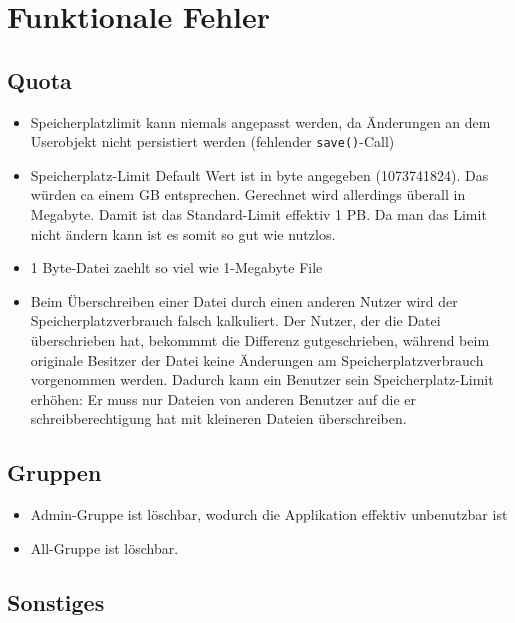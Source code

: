 \documentclass[12pt,DIV14,BCOR10mm,a4paper,parskip=half-,headsepline,headinclude,english,ngerman,bibliography=totocnumbered]{scrreprt}
\begin{document}
\vspace*{-3cm}

\tableofcontents  %

\chapter{Funktionale Fehler}


\section{Quota}

\begin{itemize}
 \item Speicherplatzlimit kann niemals angepasst werden, da Änderungen an dem Userobjekt nicht persistiert werden (fehlender \texttt{save()}-Call)
  \item Speicherplatz-Limit Default Wert ist in byte angegeben (1073741824). Das würden ca einem GB entsprechen. Gerechnet wird allerdings überall in Megabyte. Damit ist das Standard-Limit effektiv 1 PB. Da man das Limit nicht ändern kann ist es somit so gut wie nutzlos.
  \item 1 Byte-Datei zaehlt so viel wie 1-Megabyte File
  \item Beim Überschreiben einer Datei durch einen anderen Nutzer wird der Speicherplatzverbrauch falsch kalkuliert. Der Nutzer, der die Datei überschrieben hat, bekommmt die Differenz gutgeschrieben, während beim originale Besitzer der Datei keine Änderungen am Speicherplatzverbrauch vorgenommen werden. Dadurch kann ein Benutzer sein Speicherplatz-Limit erhöhen: Er muss nur Dateien von anderen Benutzer auf die er schreibberechtigung hat mit kleineren Dateien überschreiben.
  \end{itemize}



\section{Gruppen}
\begin{itemize}
\item Admin-Gruppe ist löschbar, wodurch die Applikation effektiv unbenutzbar ist
  \item All-Gruppe ist löschbar.

\end{itemize}
\section{Sonstiges}
\end{document}
